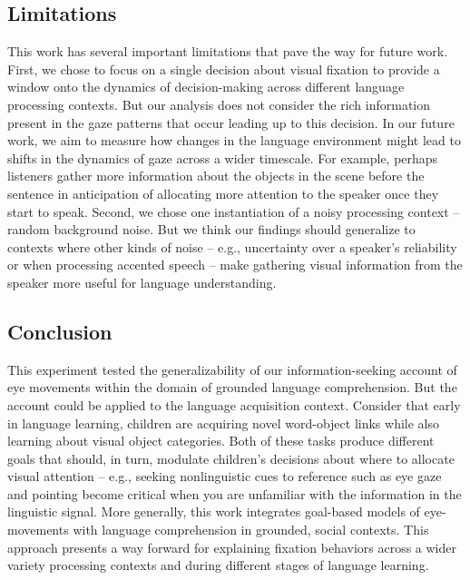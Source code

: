 \documentclass[english,floatsintext,man]{apa6}
\theoremstyle{definition}
\theoremstyle{definition}
\theoremstyle{definition}
\theoremstyle{remark}
\begin{document}
\hypertarget{limitations}{%
\subsection{Limitations}\label{limitations}}

This work has several important limitations that pave the way for future
work. First, we chose to focus on a single decision about visual
fixation to provide a window onto the dynamics of decision-making across
different language processing contexts. But our analysis does not
consider the rich information present in the gaze patterns that occur
leading up to this decision. In our future work, we aim to measure how
changes in the language environment might lead to shifts in the dynamics
of gaze across a wider timescale. For example, perhaps listeners gather
more information about the objects in the scene before the sentence in
anticipation of allocating more attention to the speaker once they start
to speak. Second, we chose one instantiation of a noisy processing
context -- random background noise. But we think our findings should
generalize to contexts where other kinds of noise -- e.g., uncertainty
over a speaker's reliability or when processing accented speech -- make
gathering visual information from the speaker more useful for language
understanding.

\hypertarget{conclusion}{%
\subsection{Conclusion}\label{conclusion}}

This experiment tested the generalizability of our information-seeking
account of eye movements within the domain of grounded language
comprehension. But the account could be applied to the language
acquisition context. Consider that early in language learning, children
are acquiring novel word-object links while also learning about visual
object categories. Both of these tasks produce different goals that
should, in turn, modulate children's decisions about where to allocate
visual attention -- e.g., seeking nonlinguistic cues to reference such
as eye gaze and pointing become critical when you are unfamiliar with
the information in the linguistic signal. More generally, this work
integrates goal-based models of eye-movements with language
comprehension in grounded, social contexts. This approach presents a way
forward for explaining fixation behaviors across a wider variety
processing contexts and during different stages of language learning.
\end{document}
